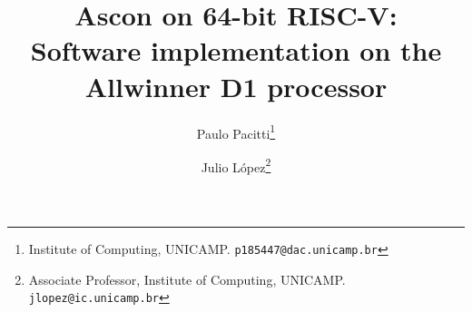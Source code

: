 \documentclass[11pt,twoside]{article}
\begin{document}
% 
\TRMakeCover


%
\pagestyle{myheadings}
\thispagestyle{empty}

%
\title{Ascon on 64-bit RISC-V: \\ Software implementation on the Allwinner D1 processor}

\author{Paulo Pacitti\thanks{Institute of Computing, UNICAMP. \texttt{p185447@dac.unicamp.br}} \and
  Julio  López\thanks{Associate Professor, Institute of Computing, UNICAMP. \texttt{jlopez@ic.unicamp.br}}}
\date{}
\maketitle

\end{document}
